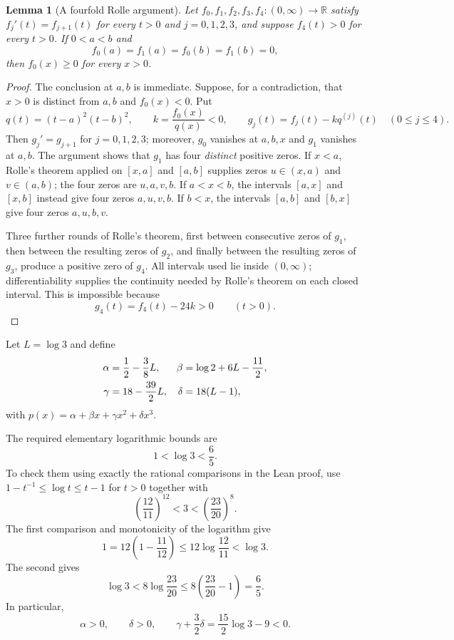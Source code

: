 \documentclass[11pt]{article}
\newtheorem{lemma}[theorem]{Lemma}
\theoremstyle{definition}
\theoremstyle{remark}
\newcommand{\R}{\mathbb R}
\begin{document}
\begin{lemma}[A fourfold Rolle argument]
\label{lem:rolle}
Let $f_0,f_1,f_2,f_3,f_4:(0,\infty)\to\R$ satisfy
$f_j'(t)=f_{j+1}(t)$ for every $t>0$ and $j=0,1,2,3$, and suppose
$f_4(t)>0$ for every $t>0$. If $0<a<b$ and
\[
 f_0(a)=f_1(a)=f_0(b)=f_1(b)=0,
\]
then $f_0(x)\geq0$ for every $x>0$.
\end{lemma}
\begin{proof}
The conclusion at $a,b$ is immediate. Suppose, for a contradiction, that
$x>0$ is distinct from $a,b$ and $f_0(x)<0$. Put
\[
 q(t)=(t-a)^2(t-b)^2,\qquad k=\frac{f_0(x)}{q(x)}<0,
 \qquad g_j(t)=f_j(t)-kq^{(j)}(t)\quad(0\leq j\leq4).
\]
Then $g_j'=g_{j+1}$ for $j=0,1,2,3$; moreover, $g_0$ vanishes at
$a,b,x$ and $g_1$ vanishes at $a,b$. The argument shows that $g_1$ has four
\emph{distinct} positive zeros. If $x<a$, Rolle's theorem applied on
$[x,a]$ and $[a,b]$ supplies zeros $u\in(x,a)$ and $v\in(a,b)$;
the four zeros are $u,a,v,b$. If $a<x<b$, the intervals $[a,x]$ and
$[x,b]$ instead give four zeros $a,u,v,b$. If $b<x$, the intervals
$[a,b]$ and $[b,x]$ give four zeros $a,u,b,v$.

Three further rounds of Rolle's theorem, first between consecutive
zeros of $g_1$, then between the resulting zeros of $g_2$, and finally
between the resulting zeros of $g_3$, produce a positive zero of $g_4$.
All intervals used lie inside $(0,\infty)$; differentiability supplies
the continuity needed by Rolle's theorem on each closed interval. This
is impossible because
\[
 g_4(t)=f_4(t)-24k>0\qquad(t>0).
\]
\end{proof}

Let $L=\log3$ and define
\begin{align}
 \alpha&=\frac12-\frac38L,&
 \beta&=\log2+6L-\frac{11}{2},\notag\\
 \gamma&=18-\frac{39}{2}L,&
 \delta&=18(L-1),
 \label{eq:coefficients}
\end{align}
with $p(x)=\alpha+\beta x+\gamma x^2+\delta x^3$.

The required elementary logarithmic bounds are
\begin{equation}
 1<\log3<\frac65.
 \label{eq:logbounds}
\end{equation}
To check them using exactly the rational comparisons in the Lean proof,
use $1-t^{-1}\leq\log t\leq t-1$ for $t>0$ together with
\[
 \left(\frac{12}{11}\right)^{12}<3
 <\left(\frac{23}{20}\right)^8.
\]
The first comparison and monotonicity of the logarithm give
\[
 1=12\left(1-\frac{11}{12}\right)
 \leq12\log\frac{12}{11}<\log3.
\]
The second gives
\[
 \log3<8\log\frac{23}{20}
 \leq8\left(\frac{23}{20}-1\right)=\frac65.
\]
In particular,
\begin{equation}
 \alpha>0,\qquad\delta>0,\qquad
 \gamma+\frac32\delta=\frac{15}{2}\log3-9<0.
 \label{eq:signs}
\end{equation}
\end{document}
